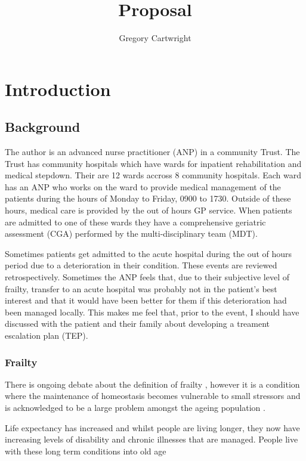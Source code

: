 \documentclass[12pt,a4paper,oneside,titlepage]{article}
\begin{document}
\author{Gregory Cartwright}
\title{Proposal}
\section*{Introduction}

\subsection*{Background}
The author is an advanced nurse practitioner (ANP) in a community Trust.
The Trust has community hospitals which have wards for inpatient rehabilitation and
medical stepdown. Their are 12 wards accross 8 community hospitals. Each ward has
an ANP who works on the ward to provide medical management of the patients during 
the hours of Monday to Friday, 0900 to 1730. Outside of these hours, medical care 
is provided by the out of hours GP service. When patients are admitted to one of
these wards they have a comprehensive geriatric assessment (CGA) \parencite{bgs:14} 
performed by the multi-disciplinary team (MDT).

Sometimes patients get admitted to the acute hospital during the out of hours period due to a 
deterioration in their condition.
These events are reviewed retrospectively. Sometimes the ANP feels that, 
due to their subjective level of frailty, transfer 
to an acute hospital was probably not in the patient's best interest and that it
would have been better for them if this deterioration had been managed locally.
This makes me feel that, prior to the event, I should have discussed with the patient and
their family about developing a treament escalation plan (TEP).

\subsubsection*{Frailty}

There is ongoing debate about the definition of frailty 
\parencite{shamliyan:13}, however it is a condition where the maintenance of homeostasis 
becomes vulnerable to 
small stressors and is acknowledged to be a large problem amongst the ageing population 
\parencite{clegg:13}.

Life expectancy has increased and whilst people are living longer, they now have increasing
levels of disability and chronic illnesses that are managed. People live with these long term 
conditions into old age
\end{document}
